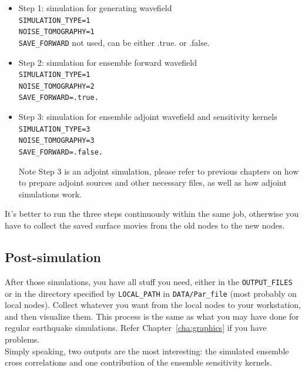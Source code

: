 \documentclass[oneside,english]{book}
\begin{document}
\begin{itemize}
\item
Step 1: simulation for generating wavefield\\
\texttt{SIMULATION\_TYPE=1}\\
\texttt{NOISE\_TOMOGRAPHY=1}\\
\texttt{SAVE\_FORWARD} not used, can be either .true. or .false.

\item
Step 2: simulation for ensemble forward wavefield\\
\texttt{SIMULATION\_TYPE=1}\\
\texttt{NOISE\_TOMOGRAPHY=2}\\
\texttt{SAVE\_FORWARD=.true.}

\item
Step 3: simulation for ensemble adjoint wavefield and sensitivity kernels\\
\texttt{SIMULATION\_TYPE=3}\\
\texttt{NOISE\_TOMOGRAPHY=3}\\
\texttt{SAVE\_FORWARD=.false.}

Note Step 3 is an adjoint simulation, please refer to previous chapters on how to prepare adjoint sources
and other necessary files, as well as how adjoint simulations work.

\end{itemize}

It's better to run the three steps continuously within the same job, otherwise you have to collect the saved surface movies
from the old nodes to the new nodes.\\

\subsection{Post-simulation}

After those simulations, you have all stuff you need, either in the \texttt{OUTPUT\_FILES} or
in the directory specified by \texttt{LOCAL\_PATH} in \texttt{DATA/Par\_file} (most probably on local nodes).
Collect whatever you want from the local nodes to your workstation, and then visualize them.
This process is the same as what you may have done for regular earthquake simulations.
Refer Chapter~\ref{cha:graphics} if you have problems.\\

Simply speaking, two outputs are the most interesting: the simulated ensemble cross correlations and
one contribution of the ensemble sensitivity kernels.\\
\end{document}
